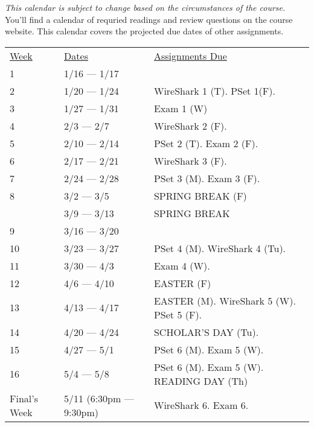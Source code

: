 \documentclass[10pt]{article}
\begin{document}
\textit{This calendar is subject to change based on the circumstances of the course.} You'll find a calendar of requried readings and review questions on the course website. This calendar covers the projected due dates of other assignments.

\begin{center}
\begin{tabular}{lll}
\underline{Week} & \underline{Dates} & \underline{Assignments Due}  \\
1 & 1/16 --- 1/17 &  \\
2 & 1/20 --- 1/24 & WireShark 1 (T). PSet 1(F). \\
3 & 1/27 --- 1/31 & Exam 1 (W)  \\
4 & 2/3 --- 2/7 & WireShark 2 (F).\\
5 & 2/10 --- 2/14 &  PSet 2 (T). Exam 2 (F). \\
6 & 2/17 --- 2/21 & WireShark 3 (F).  \\
7 & 2/24 --- 2/28 &  PSet 3 (M). Exam 3 (F).   \\
8 & 3/2 --- 3/5 & SPRING BREAK (F) \\
  & 3/9 --- 3/13 &  SPRING BREAK \\
9 & 3/16 --- 3/20 &   \\
10 & 3/23 --- 3/27 & PSet 4 (M). WireShark 4 (Tu).    \\
11 & 3/30 --- 4/3 &  Exam 4 (W).   \\
12 & 4/6 --- 4/10 &  EASTER (F) \\
13 & 4/13 --- 4/17 & EASTER (M). WireShark 5 (W). PSet 5 (F). \\
14 & 4/20 --- 4/24 & SCHOLAR'S DAY (Tu).     \\
15 & 4/27 --- 5/1 & PSet 6 (M). Exam 5 (W).  \\
16 & 5/4 --- 5/8 & PSet 6 (M). Exam 5 (W). READING DAY (Th)  \\
Final's Week & 5/11 (6:30pm --- 9:30pm) & WireShark 6. Exam 6.    \\
\end{tabular}
\end{center}
\end{document}
